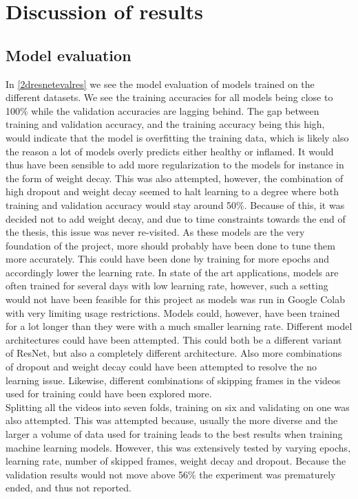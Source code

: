 \section{Discussion of results}
\subsection{Model evaluation}
In \autoref{2dresnetevalres} we see the model evaluation of models trained on the different datasets. We see the training accuracies for all models being close to 100\% while the validation accuracies are lagging behind. The gap between training and validation accuracy, and the training accuracy being this high, would indicate that the model is overfitting the training data, which is likely also the reason a lot of models overly predicts either healthy or inflamed. It would thus have been sensible to add more regularization to the models for instance in the form of weight decay. This was also attempted, however, the combination of high dropout and weight decay seemed to halt learning to a degree where both training and validation accuracy would stay around 50\%. Because of this, it was decided not to add weight decay, and due to time constraints towards the end of the thesis, this issue was never re-visited. As these models are the very foundation of the project, more should probably have been done to tune them more accurately. This could have been done by training for more epochs and accordingly lower the learning rate. In state of the art applications, models are often trained for several days with low learning rate, however, such a setting would not have been feasible for this project as models was run in Google Colab with very limiting usage restrictions. Models could, however, have been trained for a lot longer than they were with a much smaller learning rate. Different model architectures could have been attempted. This could both be a different variant of ResNet, but also a completely different architecture. Also more combinations of dropout and weight decay could have been attempted to resolve the no learning issue. Likewise, different combinations of skipping frames in the videos used for training could have been explored more.\\
Splitting all the videos into seven folds, training on six and validating on one was also attempted. This was attempted because, usually the more diverse and the larger a volume of data used for training leads to the best results when training machine learning models. However, this was extensively tested by varying epochs, learning rate, number of skipped frames, weight decay and dropout. Because the validation results would not move above 56\% the experiment was prematurely ended, and thus not reported.

